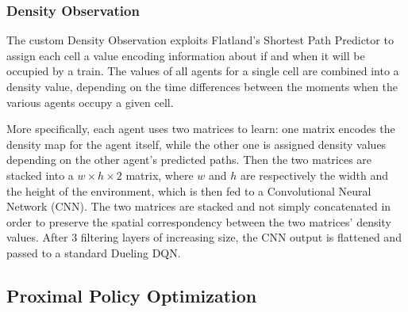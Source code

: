 \documentclass[a4paper, 12pt]{article}
\numberwithin{equation}{section}
\begin{document}
\subsubsection{Density Observation}

The custom Density Observation exploits Flatland's Shortest Path Predictor to assign each cell a value encoding information about if and when it will be occupied by a train. The values of all agents for a single cell are combined into a density value, depending on the time differences between the moments when the various agents occupy a given cell.

More specifically, each agent uses two matrices to learn: one matrix encodes the density map for the agent itself, while the other one is assigned density values depending on the other agent's predicted paths. Then the two matrices are stacked into a $w\times h\times 2$ matrix, where $w$ and $h$ are respectively the width and the height of the environment, which is then fed to a Convolutional Neural Network (CNN).%
The two matrices are stacked and not simply concatenated in order to preserve the spatial correspondency between the two matrices' density values. After 3 filtering layers of increasing size, the CNN output is flattened and passed to a standard Dueling DQN.


\subsection[Proximal Policy Optimization]{Proximal Policy Optimization \cite{ppo-algorithm, understanding-ppo}}
\end{document}
